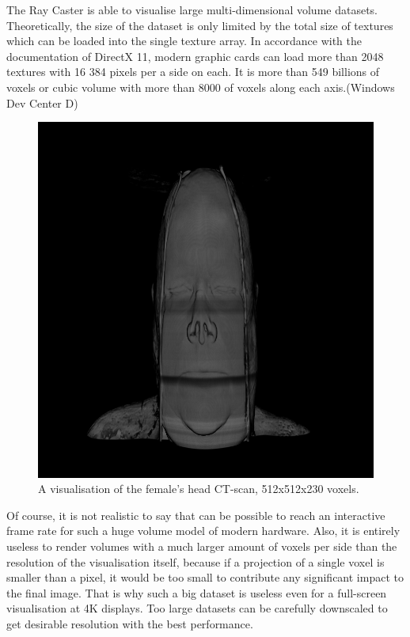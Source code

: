 \documentclass[twoside, english, 11pt]{report}
\begin{document}
The Ray Caster is able to visualise large multi-dimensional volume datasets. Theoretically, the size of the dataset is only limited by the total size of textures which can be loaded into the single texture array. In accordance with the documentation of DirectX 11, modern graphic cards can load more than 2048 textures with 16 384 pixels per a side on each. It is more than 549 billions of voxels or cubic volume with more than 8000 of voxels along each axis.(Windows Dev Center D)\\

\begin{figure}[H]
\centerline{\includegraphics[scale = 0.5]{img/head}}
\caption{A visualisation of the female's head CT-scan, 512x512x230 voxels.\label{fig:head}}
\end{figure}

Of course, it is not realistic to say that can be possible to reach an interactive frame rate for such a huge volume model of modern hardware. Also, it is entirely useless to render volumes with a much larger amount of voxels per side than the resolution of the visualisation itself, because if a projection of a single voxel is smaller than a pixel, it would be too small to contribute any significant impact to the final image. That is why such a big dataset is useless even for a full-screen visualisation at 4K displays. Too large datasets can be carefully downscaled to get desirable resolution with the best performance.\\\\
\end{document}

